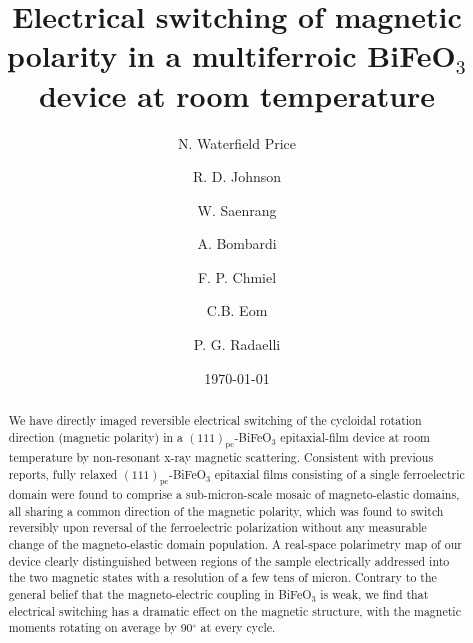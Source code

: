 \documentclass[aps,prb,twocolumn,showpacs,superscriptaddress, longbibliography, 10pt]{revtex4-1}
\begin{document}
\title{Electrical switching of magnetic polarity in a multiferroic BiFeO$_3$ device at room temperature}

\author{N. Waterfield Price}

\author{R. D. Johnson}

\author{W. Saenrang}

\author{A. Bombardi}

\author{F. P. Chmiel}

\author{C.B. Eom}

\author{P. G. Radaelli}
\date{\today}

\begin{abstract}
We have directly imaged reversible electrical switching of the cycloidal rotation direction (magnetic polarity) in a $(111)_\mathrm{pc}$-BiFeO$_3$ epitaxial-film device at room temperature by non-resonant x-ray magnetic scattering.  Consistent with previous reports, fully relaxed $(111)_\mathrm{pc}$-BiFeO$_3$ epitaxial films consisting of a single ferroelectric domain were found to comprise a sub-micron-scale mosaic of magneto-elastic domains, all sharing a common direction of the magnetic polarity, which was found to switch reversibly upon reversal of the ferroelectric polarization without any measurable change of the magneto-elastic domain population.  A real-space polarimetry map of our device clearly distinguished between regions of the sample electrically addressed into the two magnetic states with a resolution of a few tens of micron.  Contrary to the general belief that the magneto-electric coupling in BiFeO$_3$ is weak, we find that electrical switching has a dramatic effect on the magnetic structure, with the magnetic moments rotating on average by 90$^{\circ}$ at every cycle.
\end{abstract}
\end{document}

